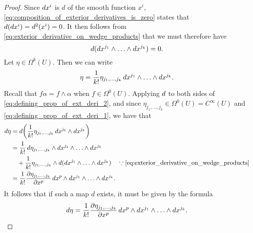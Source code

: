 \documentclass[notoc,notitlepage]{tufte-book}
\begin{document}
\begin{proof}
  Since $\mathop{}\!d{x^i}$ is $d$ of the smooth function $x^i$,
  \cref{eq:composition_of_exterior_derivatives_is_zero} states that $\mathop{}\!d{(\mathop{}\!d{x^i})} =
  \mathop{}\!d{^2(x^i)} = 0$. It then follows from \cref{eq:exterior_derivative_on_wedge_products}
  that we must therefore have
  \begin{equation}\label{eq:defining_prop_of_ext_deri_1}
    \mathop{}\!d{(\mathop{}\!d{x^{j_1}} \land \hdots \land \mathop{}\!d{x^{j_k}})} = 0.
  \end{equation}
  Let $\eta \in \Omega^k(U)$. Then we can write
  \begin{equation}\label{eq:defining_prop_of_ext_deri_2}
    \eta = \frac{1}{k!} \eta_{j_1, \ldots, j_k}  \mathop{}\!d{x^{j_1}} \land \hdots \land
      \mathop{}\!d{x^{j_k}}.
  \end{equation}
  Recall that $f \alpha = f \land \alpha$ when $f \in \Omega^0(U)$. Applying $\mathop{}\!d{}$ to
  both sides of \cref{eq:defining_prop_of_ext_deri_2}, and since $\eta_{j_1, \ldots, j_k}
  \in \Omega^0(U) = C^\infty(U)$ and \cref{eq:defining_prop_of_ext_deri_1}, we have that
  \begin{align*}
    \dif{\eta} &= \dif{\left( \frac{1}{k!} \eta_{j_1, \ldots, j_k} \dif{x^{j_1}} \land
                \dif{x^{j_k}} \right)} \\
               &= \frac{1}{k!} \dif{\eta_{j_1, \ldots, j_k}} \land \dif{x^{j_1}} \land
                \hdots \land \dif{x^{j_k}} \\
               &\quad + \frac{1}{k!} \eta_{j_1, \ldots, j_k} \land
                \dif{(\dif{x^{j_1}} \land \hdots \land \dif{x^{j_k}})} \quad \because
                \cref{eq:exterior_derivative_on_wedge_products} \\
               &= \frac{1}{k!} \frac{\partial \eta_{j_1, \ldots, j_k}}{\partial x^p}
                \dif{x^p} \land \dif{x^{j_1}} \land \hdots \land \dif{x^{j_k}}.
  \end{align*}
  It follows that if such a map $d$ exists, it must be given by the formula
  \begin{equation}\label{eq:defining_prop_of_ext_deri_defn}
    \mathop{}\!d{\eta} = \frac{1}{k!} \frac{\partial \eta_{j_1, \ldots, j_k}}{\partial x^p}
    \mathop{}\!d{x^p} \land \mathop{}\!d{x^{j_1}} \land \hdots \land \mathop{}\!d{x^{j_k}}.
  \end{equation}
  

\end{proof}
\end{document}
